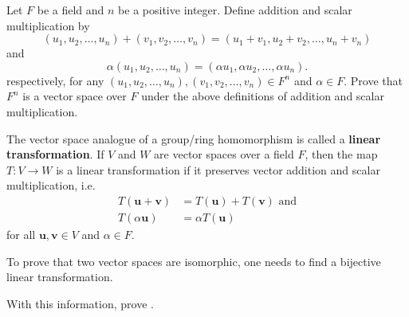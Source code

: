 \begin{problem}
    Let $F$ be a field and $n$ be a positive integer. Define addition and scalar multiplication by
    \[
        (u_1, u_2, \dots, u_n) + (v_1, v_2, \dots, v_n) = (u_1 + v_1, u_2 + v_2, \dots, u_n + v_n)
    \]
    and
    \[
        \alpha(u_1, u_2, \dots, u_n) = (\alpha u_1, \alpha u_2, \dots, \alpha u_n).
    \]
    respectively, for any $(u_1, u_2, \dots, u_n), (v_1, v_2, \dots, v_n) \in F^n$ and $\alpha \in F$. Prove that $F^n$ is a vector space over $F$ under the above definitions of addition and scalar multiplication.
\end{problem}

\begin{problem}\label{problem-vector-space-of-dimension-n-isomorphic-to-F^n}
    The vector space analogue of a group/ring homomorphism is called a \textbf{linear transformation}. If $V$ and $W$ are vector spaces over a field $F$, then the map $T: V \to W$ is a linear transformation if it preserves vector addition and scalar multiplication, i.e.
    \begin{align*}
        T(\textbf{u} + \textbf{v}) &= T(\textbf{u}) + T(\textbf{v}) \text{ and}\\
        T(\alpha\textbf{u}) &= \alpha T(\textbf{u})
    \end{align*}
    for all $\textbf{u}, \textbf{v} \in V$ and $\alpha \in F$.

    To prove that two vector spaces are isomorphic, one needs to find a bijective linear transformation.

    With this information, prove .
\end{problem}
